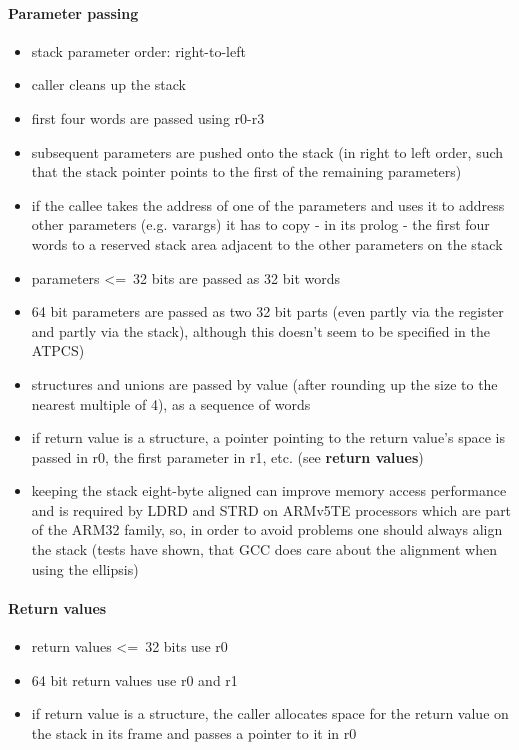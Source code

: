 \paragraph{Parameter passing}

\begin{itemize}
\item stack parameter order: right-to-left
\item caller cleans up the stack
\item first four words are passed using r0-r3
\item subsequent parameters are pushed onto the stack (in right to left order, such that the stack pointer points to the first of the remaining parameters)
\item if the callee takes the address of one of the parameters and uses it to address other parameters (e.g. varargs) it has to copy - in its prolog - the first four words to a reserved stack area adjacent to the other parameters on the stack
\item parameters \textless=\ 32 bits are passed as 32 bit words
\item 64 bit parameters are passed as two 32 bit parts (even partly via the register and partly via the stack), although this doesn't seem to be specified in the ATPCS)
\item structures and unions are passed by value (after rounding up the size to the nearest multiple of 4), as a sequence of words
\item if return value is a structure, a pointer pointing to the return value's space is passed in r0, the first parameter in r1, etc. (see {\bf return values})
\item keeping the stack eight-byte aligned can improve memory access performance and is required by LDRD and STRD on ARMv5TE processors which are part of the ARM32 family, so, in order to avoid problems one should always align the stack (tests have shown, that GCC does care about the alignment when using the ellipsis)
\end{itemize}

\paragraph{Return values}
\begin{itemize}
\item return values \textless=\ 32 bits use r0
\item 64 bit return values use r0 and r1
\item if return value is a structure, the caller allocates space for the return value on the stack in its frame and passes a pointer to it in r0
\end{itemize}

